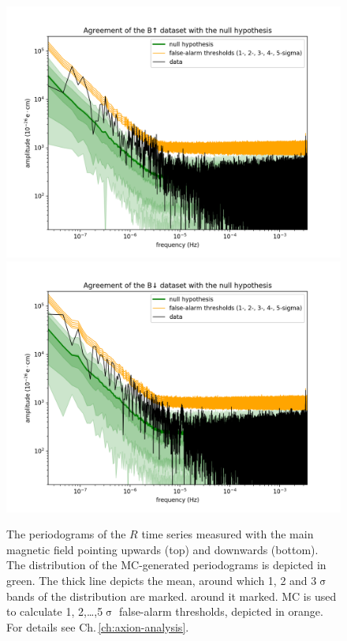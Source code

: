 \begin{figure}[h!]
  \centering
  \includegraphics[width=0.9\linewidth]{gfx/axions/winddeltah4mm_Bup_detection.png}
  \includegraphics[width=0.9\linewidth]{gfx/axions/winddeltah4mm_Bdown_detection.png}
  \caption{The periodograms of the $R$ time series measured with the main magnetic field pointing upwards (top) and downwards (bottom). The distribution of the MC-generated periodograms is depicted in green. The thick line depicts the mean, around which 1, 2 and 3$\upsigma$ bands of the distribution are marked. around it marked. MC is used to calculate 1, 2,…,5$\upsigma$ false-alarm thresholds, depicted in orange. For details see Ch.\,\ref{ch:axion-analysis}.}\label{fig:app_wind_periodogram}
\end{figure}


